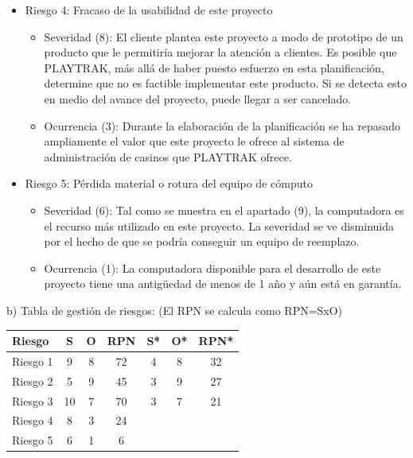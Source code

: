 \documentclass[11pt]{charter}
\begin{document}
\begin{itemize}
  \item Riesgo 4: Fracaso de la usabilidad de este proyecto
  \begin{itemize}
    \item Severidad (8): El cliente plantea este proyecto a modo de prototipo de un producto que le permitiría mejorar 
    la atención a clientes. Es posible que PLAYTRAK, más allá de haber puesto esfuerzo en esta planificación, 
    determine que no es factible implementar este producto. Si se detecta esto en medio del avance del proyecto, 
    puede llegar a ser cancelado.
    \item Ocurrencia (3): Durante la elaboración de la planificación se ha repasado ampliamente el 
    valor que este proyecto le ofrece al sistema de administración de casinos que PLAYTRAK ofrece.
  \end{itemize}
\end{itemize}
 
\begin{itemize}
  \item Riesgo 5: Pérdida material o rotura del equipo de cómputo
  \begin{itemize}
    \item Severidad (6): Tal como se muestra en el apartado (9), la computadora es el recurso más utilizado en este proyecto. 
    La severidad se ve disminuida por el hecho de que se podría conseguir un equipo de reemplazo.
    \item Ocurrencia (1): La computadora disponible para el desarrollo de este proyecto tiene una antigüedad 
    de menos de 1 año y aún está en garantía.
  \end{itemize}
\end{itemize}

b) Tabla de gestión de riesgos:      (El RPN se calcula como RPN=SxO)

\begin{table}[htpb]
\centering
\begin{tabularx}{\linewidth}{@{}|X|c|c|c|c|c|c|@{}}
\hline
\rowcolor[HTML]{C0C0C0} 
Riesgo & S & O & RPN & S* & O* & RPN* \\ \hline
Riesgo 1 & 9  & 8 & 72  & 4 & 8 & 32  \\ \hline
Riesgo 2 & 5  & 9 & 45  & 3 & 9 & 27  \\ \hline
Riesgo 3 & 10 & 7 & 70  & 3 & 7 & 21  \\ \hline
Riesgo 4 & 8  & 3 & 24  &   &   &     \\ \hline
Riesgo 5 & 6  & 1 & 6   &   &   &     \\ \hline
\end{tabularx}%
\end{table}
\end{document}

